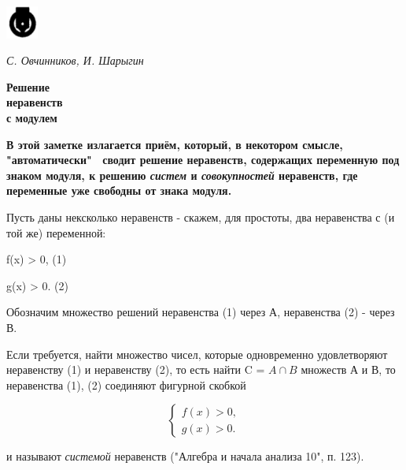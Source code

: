 \setcounter{page}{58}

\pagestyle{fancy}
\fancyhead{}
\fancyfoot{} 
\fancyfoot[LE,RO]{\thepage}


\twocolumn

\begin{flushleft}
    \includegraphics[width=0.08\textwidth]{picture}
\end{flushleft}
\vspace*{3mm}
\begin{flushleft}
\textit{С. Овчинников, И. Шарыгин}

\huge{\textbf{Решение \\неравенств \\с модулем}} 
\end{flushleft}


\begin{small}
\noindent 
\textbf{В этой заметке излагается приём, который, в некотором смысле, "автоматически" \ сводит решение неравенств, содержащих переменную под знаком модуля, к решению \textit{систем} и \textit{совокупностей} неравенств, где переменные уже свободны от знака модуля.} 
\end{small}
\vspace*{3mm}

\noindent Пусть даны нексколько неравенств - скажем, для простоты, два неравенства с  (и той же) переменной:

\noindent
\hfill f(x) > 0, \hfill {(1)}

\noindent
\hfill g(x) > 0. \hfill {(2)}

\noindent Обозначим множество решений неравенства (1) через А, неравенства (2) - через В.

Если требуется, найти множество чисел, которые одновременно удовлетворяют неравенству (1) и неравенству (2), то есть найти  C = $A\cap B$ множеств А и В, то неравенства (1), (2) соединяют фигурной скобкой

\[ 
  \begin{cases}
    f(x) > 0,\\
    g(x) > 0.
  \end{cases}
\]

\noindent и называют \textit{системой} неравенств ("Алгебра и начала анализа 10", п. 123).

